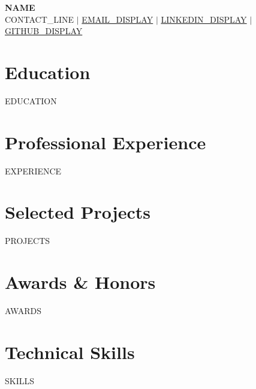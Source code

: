 \documentclass[letterpaper,10pt]{article}
\newcommand{\resumeSubHeadingListStart}{}
\newcommand{\resumeSubHeadingListEnd}{}
\begin{document}
\begin{center}
  {\LARGE\bfseries {{NAME}}}\\[3pt]
  {{CONTACT_LINE}} $\mid$
  \href{{{EMAIL_URL}}}{{{EMAIL_DISPLAY}}} $\mid$
  \href{{{LINKEDIN_URL}}}{{{LINKEDIN_DISPLAY}}} $\mid$
  \href{{{GITHUB_URL}}}{{{GITHUB_DISPLAY}}}
\end{center}

\section{Education}
\resumeSubHeadingListStart
{{EDUCATION}}
\resumeSubHeadingListEnd

\section{Professional Experience}
\resumeSubHeadingListStart
{{EXPERIENCE}}
\resumeSubHeadingListEnd

\section{Selected Projects}
\resumeSubHeadingListStart
{{PROJECTS}}
\resumeSubHeadingListEnd

\section{Awards \& Honors}
\resumeSubHeadingListStart
{{AWARDS}}
\resumeSubHeadingListEnd

\section{Technical Skills}
{{SKILLS}}

\par{}
\end{document}

